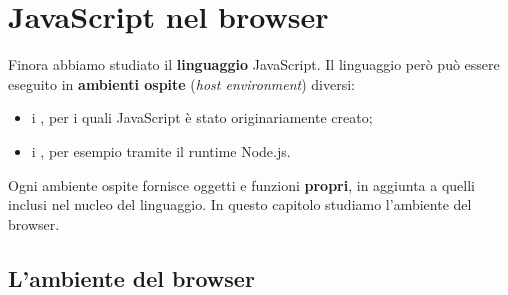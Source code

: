 \chapter{JavaScript nel browser}

Finora abbiamo studiato il \textbf{linguaggio} JavaScript. Il linguaggio però
può essere eseguito in \textbf{ambienti ospite} (\textit{host environment})
diversi:

\begin{itemize}
  \item i , per i quali JavaScript è stato originariamente
        creato;
  \item i , per esempio tramite il runtime Node.js.
\end{itemize}

Ogni ambiente ospite fornisce oggetti e funzioni \textbf{propri}, in aggiunta a
quelli inclusi nel nucleo del linguaggio. In questo capitolo studiamo l'ambiente
del browser.

\section{L'ambiente del browser}


